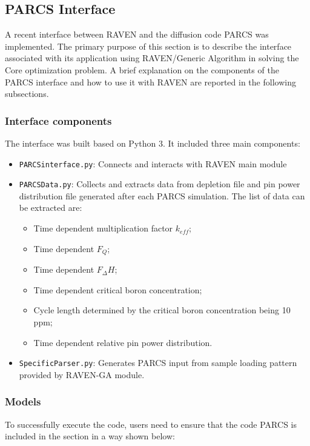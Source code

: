 \subsection{PARCS Interface}
A recent interface between RAVEN and the diffusion code PARCS was implemented.
The primary purpose of this section is to describe the interface associated
with its application using RAVEN/Generic Algorithm in solving the Core optimization problem.
A brief explanation on the components of the PARCS interface and how to use it with RAVEN
are reported in the following subsections.

\subsubsection{Interface components}
The interface was built based on Python 3. It included three main components:
\begin{itemize}

	\item \texttt{PARCSinterface.py}: Connects and interacts with RAVEN main module
	\item \texttt{PARCSData.py}: Collects and extracts data from depletion file and pin power distribution file generated after each PARCS simulation. The list of data can be extracted are:
	\begin{itemize}
  \item Time dependent multiplication factor $k_{eff}$;
	\item Time dependent $F_Q$;
	\item Time dependent $F_\Delta H$;
	\item Time dependent critical boron concentration;
	\item Cycle length determined by the critical boron concentration being 10 ppm;
	\item Time dependent relative pin power distribution.
  \end{itemize}
  \item \texttt{SpecificParser.py}: Generates PARCS input from sample loading pattern provided by RAVEN-GA module.
\end{itemize}

\subsubsection{Models}
To successfully execute the code, users need to ensure that the code PARCS is included in the
 section in a way shown below:

